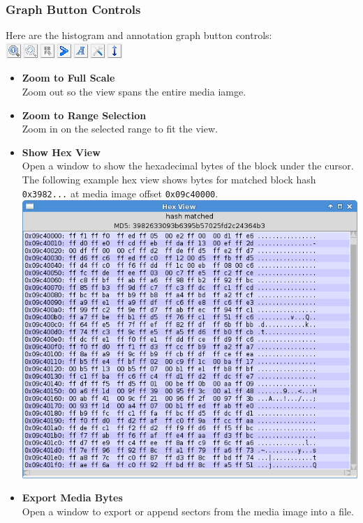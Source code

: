 \documentclass[11pt,fleqn]{article} %
\begin{document}
\subsubsection{Graph Button Controls}
Here are the histogram and annotation graph button controls:\\
\includegraphics[scale=.4]{screenshots/graph_button_controls}\\
\begin{itemize}
\item \textbf{Zoom to Full Scale}\\
Zoom out so the view spans the entire media iamge.
\item \textbf{Zoom to Range Selection}\\
Zoom in on the selected range to fit the view.
\item \textbf{Show Hex View}\\
Open a window to show the hexadecimal bytes of the block under the cursor.
The following example hex view shows bytes for matched block hash \verb+0x3982...+ at media image offset \verb+0x09c40000+.\\
\includegraphics[scale=.4]{screenshots/hex_view}\\
\item \textbf{Export Media Bytes}\\
Open a window to export or append sectors from the media image into a file.\\

\end{itemize}
\end{document}
